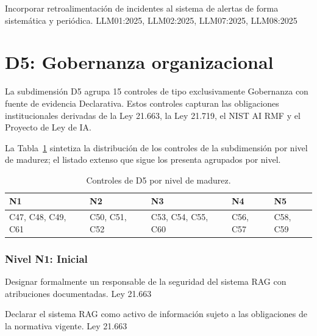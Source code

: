   {Incorporar retroalimentación de incidentes al sistema de alertas de forma sistemática y periódica.}
  {LLM01:2025, LLM02:2025, LLM07:2025, LLM08:2025}



\section{D5: Gobernanza organizacional}
\label{sec:controles-d5}

La subdimensión D5 agrupa 15 controles de tipo exclusivamente Gobernanza con fuente de evidencia Declarativa. Estos controles capturan las obligaciones institucionales derivadas de la Ley 21.663, la Ley 21.719, el NIST AI RMF y el Proyecto de Ley de IA.

La Tabla~\ref{tab:niveles-d5} sintetiza la distribución de los controles de la subdimensión por nivel de madurez; el listado extenso que sigue los presenta agrupados por nivel.

\begin{table}[H]
  \centering
  \caption{Controles de D5 por nivel de madurez.}
  \label{tab:niveles-d5}
  \begin{tabularx}{\textwidth}{@{} >{\raggedright\arraybackslash}X >{\raggedright\arraybackslash}X >{\raggedright\arraybackslash}X >{\raggedright\arraybackslash}X >{\raggedright\arraybackslash}X @{}}
    \toprule
    \cellcolor{level-n1!15}\textbf{N1} & \cellcolor{level-n2!15}\textbf{N2} & \cellcolor{level-n3!15}\textbf{N3} & \cellcolor{level-n4!15}\textbf{N4} & \cellcolor{level-n5!15}\textbf{N5} \\
    \midrule
    C47, C48, C49, C61 & C50, C51, C52 & C53, C54, C55, C60 & C56, C57 & C58, C59 \\
    \bottomrule
  \end{tabularx}
\end{table}

\subsubsection*{Nivel N1: Inicial}

  {Designar formalmente un responsable de la seguridad del sistema RAG con atribuciones documentadas.}
  {Ley 21.663}

  {Declarar el sistema RAG como activo de información sujeto a las obligaciones de la normativa vigente.}
  {Ley 21.663}

